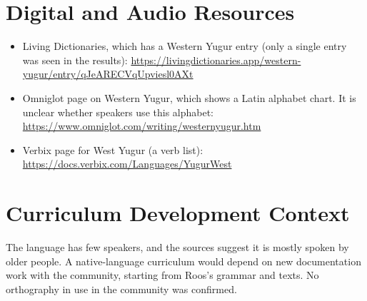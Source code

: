 \documentclass[12pt]{article}
\begin{document}
\section{Digital and Audio Resources}
\begin{itemize}
\item Living Dictionaries, which has a Western Yugur entry (only a single entry was seen in the results): \url{https://livingdictionaries.app/western-yugur/entry/qJeARECVqUpviesl0AXt}
\item Omniglot page on Western Yugur, which shows a Latin alphabet chart. It is unclear whether speakers use this alphabet: \url{https://www.omniglot.com/writing/westernyugur.htm}
\item Verbix page for West Yugur (a verb list): \url{https://docs.verbix.com/Languages/YugurWest}
\end{itemize}

\section{Curriculum Development Context}
The language has few speakers, and the sources suggest it is mostly spoken by older people. A native-language curriculum would depend on new documentation work with the community, starting from Roos's grammar and texts. No orthography in use in the community was confirmed.
\end{document}
